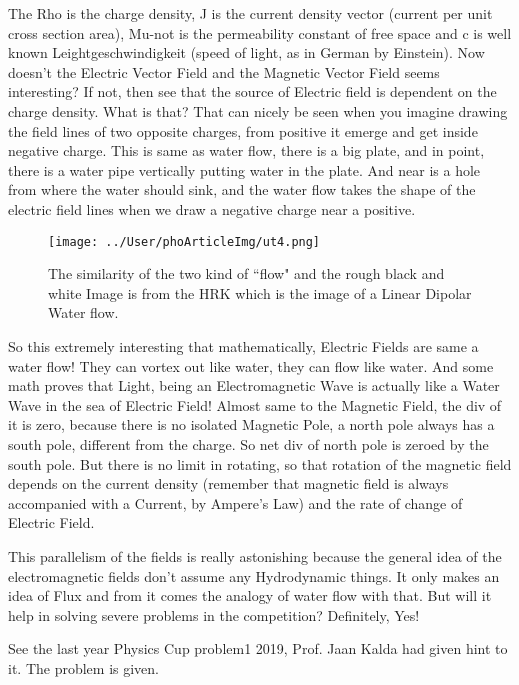\documentclass[11pt,a4paper]{article}
\begin{document}
The Rho is the charge density, J is the current density vector (current per unit cross section area), Mu-not is the permeability constant of free space and c is well known Leightgeschwindigkeit (speed of light, as in German by Einstein). Now doesn't the Electric Vector Field and the Magnetic Vector Field seems interesting? If not, then see that the source of Electric field is dependent on the charge density. What is that? That can nicely be seen when you imagine drawing the field lines of two opposite charges, from positive it emerge and get inside negative charge. This is same as water flow, there is a big plate, and in point, there is a water pipe vertically putting water in the plate. And near is a hole from where the water should sink, and the water flow takes the shape of the electric field lines when we draw a negative charge near a positive. 

	
	\begin{figure}[hbtp]
	\centering
	\texttt{[image: ../User/phoArticleImg/ut4.png]}
	\caption{The similarity of the two kind of ``flow" and the rough black and white Image is from the HRK which is the image of a Linear Dipolar Water flow.	}
	\end{figure}
	
	
	
	So this extremely interesting that mathematically, Electric Fields are same a water flow! They can vortex out like water, they can flow like water. And some math proves that Light, being an Electromagnetic Wave is actually like a Water Wave in the sea of Electric Field! Almost same to the Magnetic Field, the div of it is zero, because there is no isolated Magnetic Pole, a north pole always has a south pole, different from the charge.  So net div of north pole is zeroed by the south pole. But there is no limit in rotating, so that rotation of the magnetic field depends on the current density (remember that magnetic field is always accompanied with a Current, by Ampere's Law) and the rate of change of Electric Field.  
	
	
 	This parallelism of the fields is really astonishing because the general idea of the electromagnetic fields don't assume any Hydrodynamic things. It only makes an idea of Flux and from it comes the analogy of water flow with that. But will it help in solving severe problems in the competition? Definitely, Yes!
 	
 	
	See the last year Physics Cup problem1 2019, Prof. Jaan Kalda had given hint to it. The problem is given.
	
\end{document}
